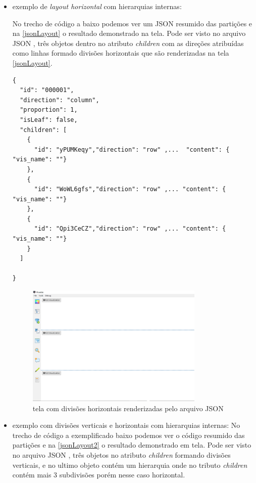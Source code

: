 \documentclass[
	12pt,				%
	openright,			%
	oneside,			%
	a4paper,			%
	english,			%
	brazil				%
	]{abntex2}
\begin{document}
\begin{itemize}
    \item exemplo de \textit{layout horizontal} com hierarquias internas:
    
    No trecho de código a baixo podemos ver um JSON resumido das partições e na \autoref{jsonLayout} o resultado demonstrado na tela. Pode ser visto no arquivo JSON , três objetos dentro no atributo \textit{children} com as direções atribuídas como linhas formado divisões horizontais que são renderizadas na tela \autoref{jsonLayout}.
     
    
\begin{verbatim}
{
  "id": "000001",
  "direction": "column",
  "proportion": 1,
  "isLeaf": false,
  "children": [
    {
      "id": "yPUMKeqy","direction": "row" ,...  "content": { "vis_name": ""}
    },
    {
      "id": "WoWL6gfs","direction": "row" ,... "content": { "vis_name": ""}
    },
    {
      "id": "Qpi3CeCZ","direction": "row" ,... "content": { "vis_name": ""}
    }
  ]
  
}

\end{verbatim}

\begin{figure}[!ht]
	\caption{\label{jsonLayout} tela com divisões horizontais renderizadas pelo arquivo JSON  }
	\begin{center}
	    \includegraphics[width=20pc]{figures/layout1.PNG}
	\end{center}
\end{figure}

    \item exemplo com divisões verticais e horizontais com hierarquias internas:
      No trecho de código a exemplificado baixo podemos ver o código resumido das partições e na \autoref{jsonLayout2} o resultado demonstrado em tela. 
      Pode ser visto no arquivo JSON , três objetos no atributo \textit{children} formando divisões verticais, e no ultimo objeto contém um hierarquia onde no tributo \textit{children} contém mais 3 subdivisões porém nesse caso horizontal.


\end{itemize}
\end{document}
